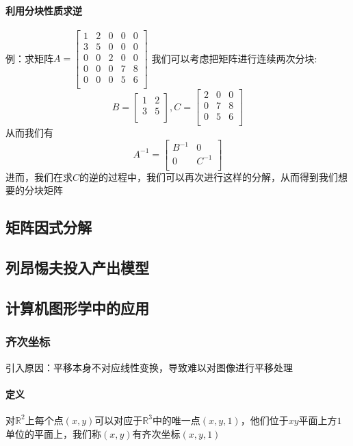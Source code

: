 \documentclass{article}
\begin{document}
\begin{CJK}{UTF8}{gkai}
\paragraph{利用分块性质求逆\\}
例：求矩阵$A=\begin{bmatrix}
1&2&0&0&0\\
3&5&0&0&0\\
0&0&2&0&0\\
0&0&0&7&8\\
0&0&0&5&6\\
\end{bmatrix}$
我们可以考虑把矩阵进行连续两次分块:\\
\[B=\begin{bmatrix}
    1&2\\
    3&5\\
\end{bmatrix},C=\begin{bmatrix}
    2&0&0\\
    0&7&8\\
    0&5&6\\
    \end{bmatrix}\]
从而我们有
\[A^{-1}=\begin{bmatrix}
B^{-1}&0\\
0&C^{-1}\\
\end{bmatrix}\]
进而，我们在求$C$的逆的过程中，我们可以再次进行这样的分解，从而得到我们想要的分块矩阵\\
\subsection{矩阵因式分解}
\subsection{列昂惕夫投入产出模型}
\subsection{计算机图形学中的应用}
\subsubsection{齐次坐标}
引入原因：平移本身不对应线性变换，导致难以对图像进行平移处理\\
\paragraph{定义\\}
对$\mathbb{R}^2$上每个点$(x,y)$可以对应于$\mathbb{R}^3$中的唯一点$(x,y,1)$，他们位于$xy$平面上方$1$单位的平面上，我们称$(x,y)$有齐次坐标$(x,y,1)$\\


\end{CJK}
\end{document}
